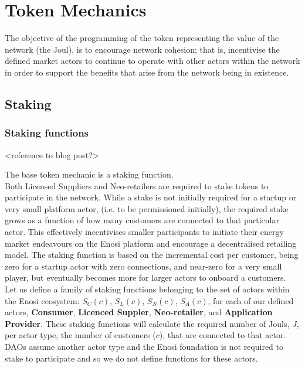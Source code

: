 \documentclass{article}
\theoremstyle{definition}
\theoremstyle{plain} %
\begin{document}
\pagebreak
\section{Token Mechanics}

\noindent The objective of the programming of the token representing the value of the network (the Joul), is to encourage network cohesion; that is, incentivise the defined market actors to continue to operate with other actors within the network in order to support the benefits that arise from the network being in existence.

\subsection{Staking}

\subsubsection{Staking functions}

<reference to blog post?>

\noindent The base token mechanic is a staking function. \\

\noindent Both Licensed Suppliers and Neo-retailers are required to stake tokens to participate in the network. While a stake is not initially required for a startup or very small platform actor, (i.e. to be permissioned initially), the required stake grows as a function of how many customers are connected to that particular actor. This effectively incentivises smaller participants to initiate their energy market endeavours on the Enosi platform and encourage a decentralised retailing model. The staking function is based on the incremental cost per customer, being zero for a startup actor with zero connections, and near-zero for a very small player, but eventually becomes more for larger actors to onboard a customers. \\

\noindent Let us define a family of staking functions belonging to the set of actors within the Enosi ecosystem: $S_C(c)$, $S_L(c)$, $S_N(c)$, $S_A(c)$, for each of our defined actors, \textbf{Consumer}, \textbf{Licenced Suppler}, \textbf{Neo-retailer}, and \textbf{Application Provider}. These staking functions will calculate the required number of Jouls, $J$, per actor type, the number of customers ($c$), that are connected to that actor. DAOs assume another actor type and the Enosi foundation is not required to stake to participate and so we do not define functions for these actors. \\
\end{document}
